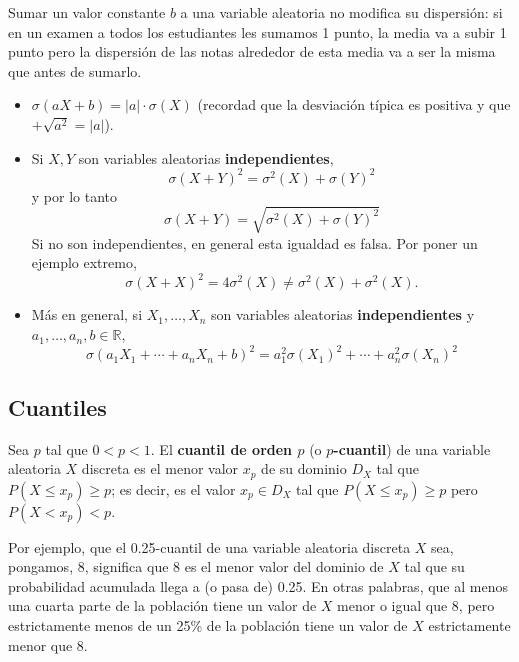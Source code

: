 \documentclass[
  spanish,
  letterpaper,
  DIV=11,
  numbers=noendperiod]{scrreprt}
\begin{document}
\begin{tcolorbox}[enhanced jigsaw, arc=.35mm, bottomrule=.15mm, bottomtitle=1mm, breakable, colback=white, colbacktitle=quarto-callout-note-color!10!white, colframe=quarto-callout-note-color-frame, coltitle=black, left=2mm, leftrule=.75mm, opacityback=0, opacitybacktitle=0.6, rightrule=.15mm, title=\textcolor{quarto-callout-note-color}{\faInfo}\hspace{0.5em}{Nota}, titlerule=0mm, toprule=.15mm, toptitle=1mm]

Sumar un valor constante \(b\) a una variable aleatoria no modifica su
dispersión: si en un examen a todos los estudiantes les sumamos 1 punto,
la media va a subir 1 punto pero la dispersión de las notas alrededor de
esta media va a ser la misma que antes de sumarlo.

\end{tcolorbox}

\begin{itemize}
\item
  \(\sigma(aX+b)=|a|\cdot \sigma(X)\) (recordad que la desviación típica
  es positiva y que \(+\sqrt{a^2}=|a|\)).
\item
  Si \(X,Y\) son variables aleatorias \textbf{independientes}, \[
  \sigma(X+Y)^2=\sigma^2(X)+\sigma(Y)^2
  \] y por lo tanto \[
  \sigma(X+Y)=\sqrt{\sigma^2(X)+\sigma(Y)^2}
  \] Si no son independientes, en general esta igualdad es falsa. Por
  poner un ejemplo extremo, \[
  \sigma(X+X)^2=4\sigma^2(X)\neq \sigma^2(X)+\sigma^2(X).
  \]
\item
  Más en general, si \(X_1,\ldots,X_n\) son variables aleatorias
  \textbf{independientes} y \(a_1,\ldots,a_n,b\in \mathbb{R}\), \[
     \sigma(a_1X_1+\cdots +a_nX_n+b)^2=a_1^2\sigma(X_1)^2+\cdots +a_n^2\sigma(X_n)^2
      \]
\end{itemize}

\subsection{Cuantiles}\label{cuantiles}

Sea \(p\) tal que \(0<p<1\). El \textbf{cuantil de orden \(p\)} (o
\textbf{\(p\)-cuantil}) de una variable aleatoria \(X\) discreta es el
menor valor \(x_p\) de su dominio \(D_X\) tal que
\(P(X\leqslant x_p)\geqslant p\); es decir, es el valor \(x_p\in D_X\)
tal que \(P(X\leqslant x_p)\geqslant p\) pero \(P(X< x_p)<p\).

Por ejemplo, que el 0.25-cuantil de una variable aleatoria discreta
\(X\) sea, pongamos, 8, significa que 8 es el menor valor del dominio de
\(X\) tal que su probabilidad acumulada llega a (o pasa de) 0.25. En
otras palabras, que al menos una cuarta parte de la población tiene un
valor de \(X\) menor o igual que 8, pero estrictamente menos de un 25\%
de la población tiene un valor de \(X\) estrictamente menor que 8.
\end{document}
